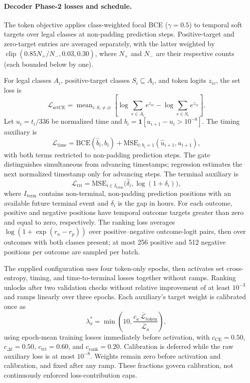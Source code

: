 \paragraph{Decoder Phase-2 losses and schedule.}
\label{app:ar-phase2-loss}
The token objective applies class-weighted focal BCE ($\gamma=0.5$) to temporal soft targets over legal classes at non-padding prediction steps. Positive-target and zero-target entries are averaged separately, with the latter weighted by $\operatorname{clip}(0.85N_+/N_-,0.03,0.30)$, where $N_+$ and $N_-$ are their respective counts (each bounded below by one).

For legal classes $A_i$, positive-target classes $S_i\subseteq A_i$, and token logits $z_{iv}$, the set loss is
\begin{equation}
\mathcal{L}_{\mathrm{setCE}}=\operatorname{mean}_{i:S_i\ne\varnothing}
\left[\log\sum_{v\in A_i}e^{z_{iv}}-\log\sum_{v\in S_i}e^{z_{iv}}\right].
\end{equation}
Let $u_i=t_i/336$ be normalized time and $b_i=\mathbf{1}[u_{i+1}-u_i>10^{-8}]$. The timing auxiliary is
\begin{equation}
\mathcal{L}_{\mathrm{time}}=\mathrm{BCE}(\hat b_i,b_i)
+\mathrm{MSE}_{i:b_i=1}(\hat u_{i+1},u_{i+1}),
\end{equation}
with both terms restricted to non-padding prediction steps. The gate distinguishes simultaneous from advancing timestamps; regression estimates the next normalized timestamp only for advancing steps. The terminal auxiliary is
\begin{equation}
\mathcal{L}_{\mathrm{ttt}}=\mathrm{MSE}_{i\in I_{\mathrm{term}}}
\big(\hat\delta_i,\log(1+\delta_i)\big),
\end{equation}
where $I_{\mathrm{term}}$ contains non-terminal, non-padding prediction positions with an available future terminal event and $\delta_i$ is the gap in hours. For each outcome, positive and negative positions have temporal outcome targets greater than zero and equal to zero, respectively. The ranking loss averages $\log(1+\exp(r_n-r_p))$ over positive--negative outcome-logit pairs, then over outcomes with both classes present; at most 256 positive and 512 negative positions per outcome are sampled per batch.

The supplied configuration uses four token-only epochs, then activates set cross-entropy, timing, and time-to-terminal losses together without ramps. Ranking unlocks after two validation checks without relative improvement of at least $10^{-3}$ and ramps linearly over three epochs. Each auxiliary's target weight is calibrated once as
\begin{equation}
\lambda_a^*=\min\!\left(10,\frac{c_a\,\overline{\mathcal{L}}_{\mathrm{token}}}{\overline{\mathcal{L}}_a}\right),
\end{equation}
using epoch-mean training losses immediately before activation, with $c_{\mathrm{CE}}=0.50$, $c_{\Delta t}=0.50$, $c_{\mathrm{ttt}}=0.60$, and $c_{\mathrm{rank}}=0.20$. Calibration is deferred while the raw auxiliary loss is at most $10^{-8}$. Weights remain zero before activation and calibration, and fixed after any ramp. These fractions govern calibration, not continuously enforced loss-contribution caps.

